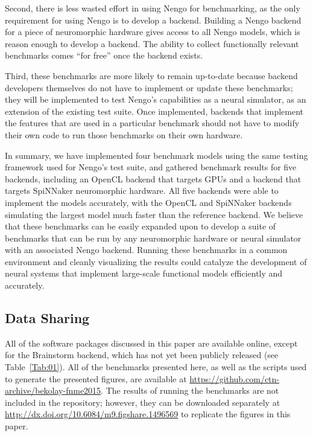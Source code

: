 \documentclass{frontiersSCNS}
\begin{document}
Second, there is less wasted effort
in using Nengo for benchmarking,
as the only requirement for using
Nengo is to develop a backend.
Building a Nengo backend for
a piece of neuromorphic hardware
gives access to all Nengo models,
which is reason enough to develop a backend.
The ability to collect functionally relevant benchmarks
comes ``for free'' once the backend exists.

Third, these benchmarks are more likely to
remain up-to-date because backend developers
themselves do not have to implement or update
these benchmarks;
they will be implemented to test Nengo's
capabilities as a neural simulator,
as an extension of the existing test suite.
Once implemented, backends that implement
the features that are used in a particular benchmark
should not have to modify their own code
to run those benchmarks on their own hardware.

In summary, we have implemented
four benchmark models using the same
testing framework used for Nengo's test suite,
and gathered benchmark results
for five backends,
including an OpenCL backend that targets GPUs
and a backend that targets
SpiNNaker neuromorphic hardware.
All five backends were able to implement
the models accurately,
with the OpenCL and SpiNNaker backends
simulating the largest model much faster
than the reference backend.
We believe that these benchmarks
can be easily expanded upon
to develop a suite of benchmarks
that can be run by any neuromorphic hardware
or neural simulator
with an associated Nengo backend.
Running these benchmarks in a common environment
and cleanly visualizing the results
could catalyze the development of
neural systems that implement
large-scale functional models
efficiently and accurately.

\subsection{Data Sharing}

All of the software packages discussed in this paper
are available online,
except for the Brainstorm backend,
which has not yet been publicly released
(see Table~\ref{Tab:01}).
All of the benchmarks presented here,
as well as the scripts used to generate
the presented figures,
are available at
\url{https://github.com/ctn-archive/bekolay-fnme2015}.
The results of running the benchmarks
are not included in the repository;
however, they can be downloaded separately at
\url{http://dx.doi.org/10.6084/m9.figshare.1496569}
to replicate the figures in this paper.
\end{document}

